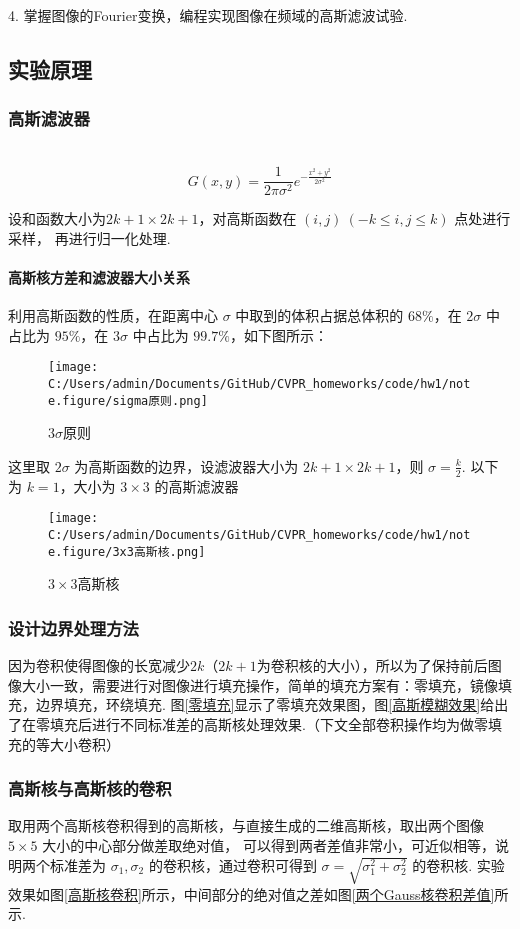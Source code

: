 \documentclass[12pt, a4paper, oneside]{ctexart}
\begin{document}
4. 掌握图像的Fourier变换，编程实现图像在频域的高斯滤波试验.
\subsection{实验原理}
\subsubsection{高斯滤波器}\ \vspace{-0.5cm}
\[G(x, y) = \frac{1}{2\pi\sigma^2}e^{-\frac{x^2+y^2}{2\sigma^2}}\]

设和函数大小为$2k+1\times 2k+1$，对高斯函数在 \((i,j)\ (-k\leqslant i,j\leqslant k)\) 点处进行采样，
再进行归一化处理.

\paragraph{高斯核方差和滤波器大小关系}

利用高斯函数的性质，在距离中心 \(\sigma\) 中取到的体积占据总体积的
\(68\%\)，在 \(2\sigma\) 中占比为 \(95\%\)，在 \(3\sigma\) 中占比为
\(99.7\%\)，如下图所示：

\begin{figure}[htbp]
    \centering
    \texttt{[image: C:/Users/admin/Documents/GitHub/CVPR\_homeworks/code/hw1/note.figure/sigma原则.png]}
    \caption{$3\sigma$原则}
\end{figure}

这里取 \(2\sigma\) 为高斯函数的边界，设滤波器大小为
\(2k+1\times 2k+1\)，则 \(\sigma = \frac{k}{2}\). 以下为 \(k=1\)，大小为
\(3\times 3\) 的高斯滤波器

\begin{figure}[htbp]
    \centering
    \texttt{[image: C:/Users/admin/Documents/GitHub/CVPR\_homeworks/code/hw1/note.figure/3x3高斯核.png]}
    \caption{$3 \times 3$高斯核}
\end{figure}
\subsubsection{设计边界处理方法}
因为卷积使得图像的长宽减少$2k$（$2k+1$为卷积核的大小），所以为了保持前后图像大小一致，需要进行对图像进行填充操作，简单的填充方案有：零填充，镜像填充，边界填充，环绕填充. 图\ref{零填充}显示了零填充效果图，图\ref{高斯模糊效果}给出了在零填充后进行不同标准差的高斯核处理效果.（下文全部卷积操作均为做零填充的等大小卷积）
\subsubsection{高斯核与高斯核的卷积}
取用两个高斯核卷积得到的高斯核，与直接生成的二维高斯核，取出两个图像 \(5\times 5\) 大小的中心部分做差取绝对值，
可以得到两者差值非常小，可近似相等，说明两个标准差为
\(\sigma_1,\sigma_2\) 的卷积核，通过卷积可得到
\(\sigma = \sqrt{\sigma_1^2+\sigma_2^2}\) 的卷积核. 实验效果如图\ref{高斯核卷积}所示，中间部分的绝对值之差如图\ref{两个Gauss核卷积差值}所示.
\end{document}
